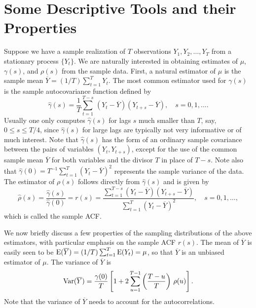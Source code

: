 \section{Some Descriptive Tools and their Properties} 


Suppose we have a sample realization of $T$ observations $Y_1, Y_2, \ldots, Y_T$ from a stationary process $\{Y_t\}$. We are naturally interested in obtaining estimates of $\mu$, $\gamma(s)$, and $\rho(s)$ from the sample data. First, a natural estimator of $\mu$ is the sample mean $\overline{Y}= (1/T) \sum_{t=1}^T Y_t$. The most common estimator used for $\gamma(s)$ is the sample autocovariance function defined by
	\[
	\hat{\gamma}(s)= \frac{1}{T} \sum_{t=1}^{T-s} \, \left(Y_{t}-\overline{Y}\right) \left(Y_{t+s}-\overline{Y}\right), \quad s=0, 1, \ldots.
	\]
Usually one only computes $\hat{\gamma}(s)$ for lags $s$ much smaller than $T$, say, $0 \leq s \leq T/4$, since $\hat{\gamma}(s)$ for large lags are typically not very informative or of much interest. Note that $\hat{\gamma}(s)$ has the form of an ordinary sample covariance between the pairs of variables $(Y_t, Y_{t+s})$, except for the use of the common sample mean $\overline{Y}$ for both variables and the divisor $T$ in place of $T-s$.  Note also that $\hat{\gamma}(0) = T^{-1}\sum_{t=1}^T (Y_t-\overline{Y})^2$ represents the sample variance of the data.  The estimator of $\rho(s)$ follows directly from $\hat{\gamma}(s)$ and is given by
	\begin{equation} \label{eqn:hatrho}
         \hat{\rho}(s)= \frac{\hat{\gamma}(s)}{\hat{\gamma}(0)}= r(s)= \frac{\sum_{t=1}^{T-s} \left(Y_{t}-\overline{Y}\right) \left(Y_{t+s}-\overline{Y}\right)}{\sum_{t=1}^T(Y_t-\overline{Y})^2} , \quad s= 0, 1, \ldots,
	\end{equation}
which is called the sample ACF.  


We now briefly discuss a few properties of the sampling distributions of the above estimators, with particular emphasis on the sample ACF $r(s)$.  The mean of $\overline{Y}$ is easily seen to be $\operatorname{E}(\overline{Y})= (1/T) \sum_{t=1}^T \operatorname{E}(Y_t) = \mu$, so that $\overline{Y}$ is an unbiased estimator of $\mu$.  The variance of $\overline{Y}$ is
	\begin{equation} \label{eqn:var}
        \var(\overline{Y})= \frac{\gamma(0)}{T} \left[ 1 + 2 \sum_{u=1}^{T-1} \left(\dfrac{T - u}{T}\right)\, \rho(u) \right].
        \end{equation}
Note that the variance of $\overline{Y}$ needs to account for the autocorrelations. 



